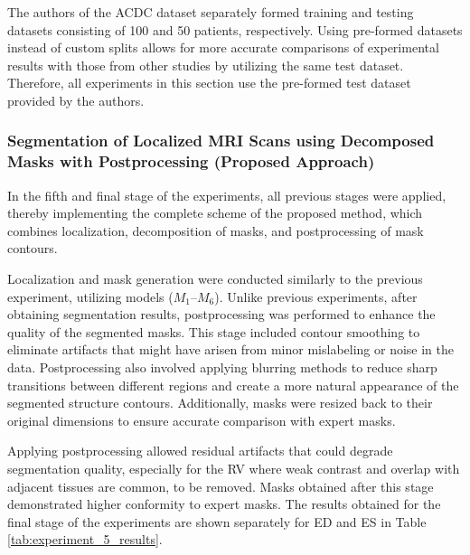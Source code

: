 \documentclass[fleqn,10pt]{wlscirep}
\begin{document}
The authors of the ACDC dataset \cite{Bernard:2018} separately formed training and testing datasets consisting of 100 and 50 patients, respectively. Using pre-formed datasets instead of custom splits allows for more accurate comparisons of experimental results with those from other studies by utilizing the same test dataset. Therefore, all experiments in this section use the pre-formed test dataset provided by the authors.

\subsubsection*{Segmentation of Localized MRI Scans using Decomposed Masks with Postprocessing (Proposed Approach)}

In the fifth and final stage of the experiments, all previous stages were applied, thereby implementing the complete scheme of the proposed method, which combines localization, decomposition of masks, and postprocessing of mask contours.

Localization and mask generation were conducted similarly to the previous experiment, utilizing models (\({M_1}\)--\({M_6}\)). Unlike previous experiments, after obtaining segmentation results, postprocessing was performed to enhance the quality of the segmented masks. This stage included contour smoothing to eliminate artifacts that might have arisen from minor mislabeling or noise in the data. Postprocessing also involved applying blurring methods to reduce sharp transitions between different regions and create a more natural appearance of the segmented structure contours. Additionally, masks were resized back to their original dimensions to ensure accurate comparison with expert masks.

Applying postprocessing allowed residual artifacts that could degrade segmentation quality, especially for the RV where weak contrast and overlap with adjacent tissues are common, to be removed. Masks obtained after this stage demonstrated higher conformity to expert masks.
The results obtained for the final stage of the experiments are shown separately for ED and ES in Table \ref{tab:experiment_5_results}.
\end{document}
